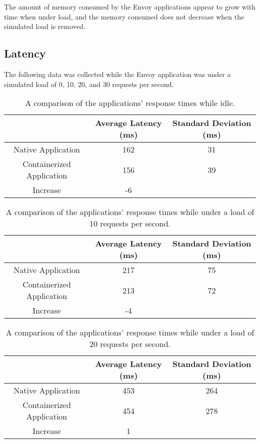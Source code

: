 \documentclass{article}
\begin{document}
The amount of memory consumed by the Envoy applications appear to grow with time when under load, and the memory consumed does not decrease when the simulated load is removed.

\subsection{Latency}
The following data was collected while the Envoy application was under a simulated load of 0, 10, 20, and 30 requests per second.

\begin{table}[H]
\begin{tabular}{ |c|c|c| }
 \hline
 & Average Latency (ms) & Standard Deviation (ms) \\
 \hline
 Native Application & 162 & 31 \\
 \hline
 Containerized Application & 156 & 39 \\
 \hline\hline
 Increase & -6 & \\
 \hline
\end{tabular}
\caption{A comparison of the applications' response times while idle.}
\label{idle-latency}
\end{table}

\begin{table}[H]
\begin{tabular}{ |c|c|c| }
 \hline
 & Average Latency (ms) & Standard Deviation (ms) \\
 \hline
 Native Application & 217 & 75 \\
 \hline
 Containerized Application & 213 & 72 \\
 \hline\hline
 Increase & -4 & \\
 \hline
\end{tabular}
\caption{A comparison of the applications' response times while under a load of 10 requests per second.}
\label{latency-under-load-10}
\end{table}

\begin{table}[H]
\begin{tabular}{ |c|c|c| }
 \hline
 & Average Latency (ms) & Standard Deviation (ms) \\
 \hline
 Native Application & 453 & 264 \\
 \hline
 Containerized Application & 454 & 278 \\
 \hline\hline
 Increase & 1 & \\
 \hline
\end{tabular}
\caption{A comparison of the applications' response times while under a load of 20 requests per second.}
\label{latency-under-load-20}
\end{table}
\end{document}
